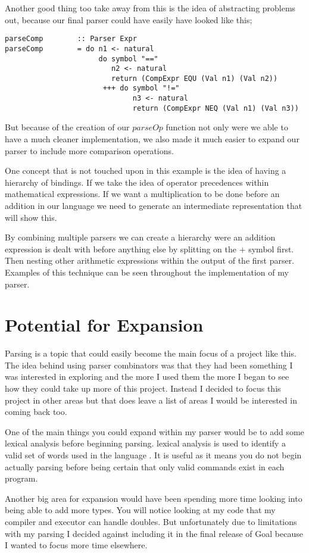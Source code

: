 Another good thing too take away from this is the idea of abstracting problems out, because our final parser could have easily have looked like this;

\begin{lstlisting}
parseComp        :: Parser Expr	
parseComp        = do n1 <- natural
                      do symbol "==" 
                         n2 <- natural
                         return (CompExpr EQU (Val n1) (Val n2))
                       +++ do symbol "!="
                              n3 <- natural
                              return (CompExpr NEQ (Val n1) (Val n3))
\end{lstlisting}

But because of the creation of our $parseOp$ function not only were we able to have a much cleaner implementation, we also made it  much easier to expand our parser to include more comparison operations.

One concept that is not touched upon in this example is the idea of having a hierarchy of bindings. If we take the idea of operator precedences within mathematical expressions. If we want a multiplication to be done before an addition in our language we need to generate an intermediate representation that will show this.

By combining multiple parsers we can create a hierarchy were an addition expression is dealt with before anything else by splitting on the $+$ symbol first. Then nesting other arithmetic expressions within the output of the first parser. Examples of this technique can be seen throughout the implementation of my parser.


\section{Potential for Expansion}

Parsing is a topic that could easily become the main focus of a project like this. The idea behind using parser combinators was that they had been something I was interested in exploring and the more I used them the more I began to see how they could take up more of this project. Instead I decided to focus this project in other areas but that does leave a list of areas I would be interested in coming back too. 

One of the main things you could expand within my parser would be to add some lexical analysis before beginning parsing. lexical analysis is used to identify a valid set of words used in the language \cite[p.~13]{CompDes2005}. It is useful as it means you do not begin actually parsing before being certain that only valid commands exist in each program.

Another big area for expansion would have been spending more time looking into being able to add more types. You will notice looking at my code that my compiler and executor can handle doubles. But unfortunately due to limitations with my parsing I decided against including it in the final release of Goal because I wanted to focus more time elsewhere.   
 